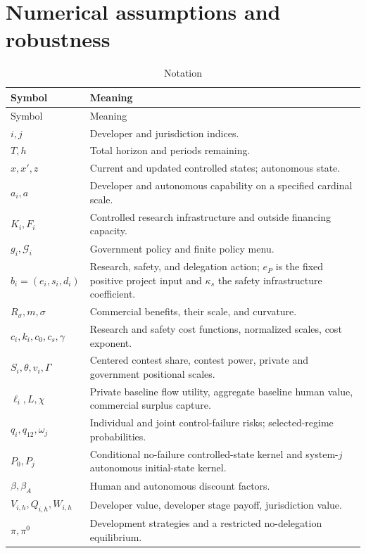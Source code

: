 \section{Numerical assumptions and robustness}\label{app:parameters}
\begingroup\small{}
\begin{longtable}{p{}p{}}
\caption{Notation}\label{tab:notation}\\
\toprule Symbol & Meaning\\\midrule\endfirsthead
\toprule Symbol & Meaning\\\midrule\endhead
$i,j$ & Developer and jurisdiction indices.\\
$T,h$ & Total horizon and periods remaining.\\
$x,x',z$ & Current and updated controlled states; autonomous state.\\
$a_i,a$ & Developer and autonomous capability on a specified cardinal scale.\\
$K_i,F_i$ & Controlled research infrastructure and outside financing capacity.\\
$g_i,\mathcal G_i$ & Government policy and finite policy menu.\\
$b_i=(e_i,s_i,d_i)$ & Research, safety, and delegation action; $e_P$ is the fixed positive project input and $\kappa_s$ the safety infrastructure coefficient.\\
$R_\sigma,m,\sigma$ & Commercial benefits, their scale, and curvature.\\
$c_i,k_i,c_0,c_s,\gamma$ & Research and safety cost functions, normalized scales, cost exponent.\\
$S_i,\theta,v_i,\Gamma$ & Centered contest share, contest power, private and government positional scales.\\
$\ell_i,L,\chi$ & Private baseline flow utility, aggregate baseline human value, commercial surplus capture.\\
$q_i,q_{12},\omega_j$ & Individual and joint control-failure risks; selected-regime probabilities.\\
$P_0,P_j$ & Conditional no-failure controlled-state kernel and system-$j$ autonomous initial-state kernel.\\
$\beta,\beta_A$ & Human and autonomous discount factors.\\
$V_{i,h},Q_{i,h},W_{i,h}$ & Developer value, developer stage payoff, jurisdiction value.\\
$\pi,\pi^0$ & Development strategies and a restricted no-delegation equilibrium.\\

\end{longtable}
